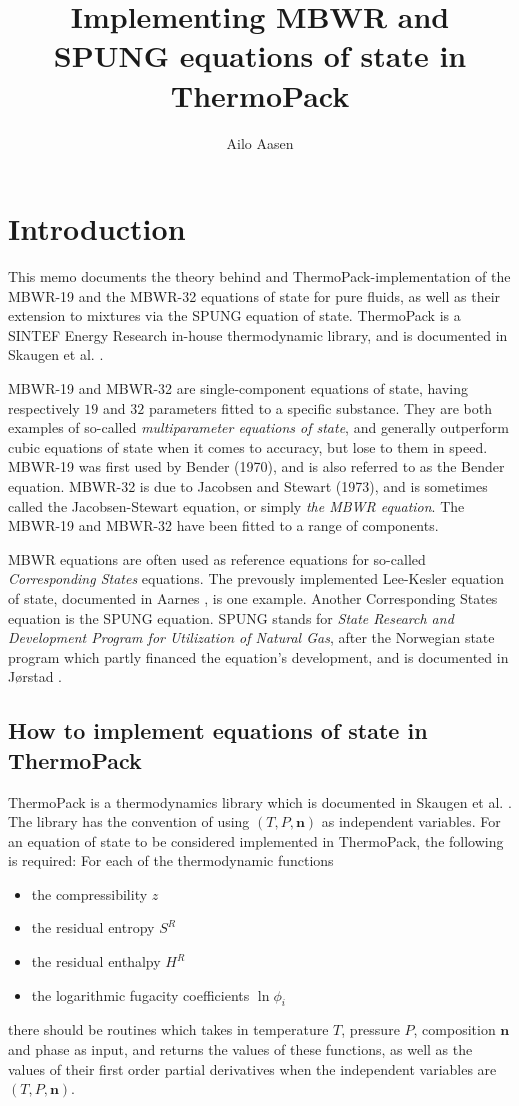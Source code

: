\documentclass[english]{../thermomemo/thermomemo}
\title{Implementing MBWR and SPUNG equations of state in ThermoPack}
\author{Ailo Aasen}
\newcommand{\mbn}[0]{\mathbf n}
\numberwithin{equation}{section}
\begin{document}
\frontmatter
\tableofcontents

\section{Introduction}
This memo documents the theory behind and ThermoPack-implementation of
the MBWR-19 and the MBWR-32 equations of state for pure fluids, as
well as their extension to mixtures via the SPUNG equation of
state. ThermoPack is a SINTEF Energy Research in-house thermodynamic library, and is
documented in Skaugen et al. \cite{ThermoPackDoc13}.

MBWR-19 and MBWR-32 are single-component equations of
state, having respectively $19$ and $32$ parameters fitted
to a specific substance. They are both examples of so-called
\textit{multiparameter equations of state}, and generally outperform
cubic equations of state when it comes to accuracy, but lose to them
in speed. MBWR-19 was first used by Bender (1970), and is also
referred to as the Bender equation. MBWR-32 is due to Jacobsen and
Stewart (1973), and is sometimes called the Jacobsen-Stewart equation,
or simply \textit{the MBWR equation}. The MBWR-19 and MBWR-32 have
been fitted to a range of components.

MBWR equations are often used as reference equations for so-called
\textit{Corresponding States} equations. The prevously implemented
Lee-Kesler equation of state, documented in Aarnes \cite{Aarnes13}, is
one example. Another Corresponding States equation is the SPUNG
equation. SPUNG stands for \textit{State Research and Development
  Program for Utilization of Natural Gas}, after the Norwegian state
program which partly financed the equation's development, and is
documented in J{\o}rstad \cite{Jorstad93}.

\subsection{How to implement equations of state in ThermoPack}
ThermoPack is a thermodynamics library which is documented in Skaugen et al.
\cite{ThermoPackDoc13}. The library has the convention of using $(T, P, \mbn)$ as
independent variables. For an equation of state to be considered implemented
in ThermoPack, the following is required: For each of the thermodynamic functions
\begin{itemize}
\item the compressibility $z$
\item the residual entropy $S^R$
\item the residual enthalpy $H^R$
\item the logarithmic fugacity coefficients $\ln \phi_i$
\end{itemize}
there should be routines which takes in temperature $T$, pressure $P$,
composition $\mbn$ and phase as input, and returns the values of these functions, as
well as the values of their first order partial derivatives when the independent
variables are $(T, P, \mbn)$.
\end{document}
